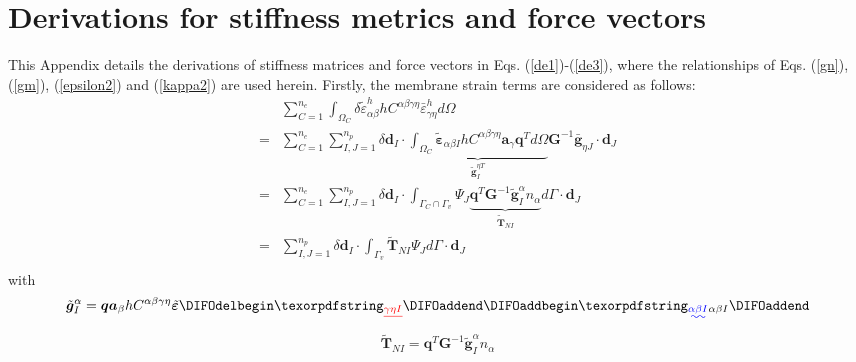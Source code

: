 \section{Derivations for stiffness metrics and force vectors}\label{derivations}
This Appendix details the derivations of stiffness matrices and force vectors in Eqs. (\ref{de1})-(\ref{de3}), where the relationships of Eqs. (\ref{gn}), (\ref{gm}), (\ref{epsilon2}) and (\ref{kappa2}) are used herein. Firstly, the membrane strain terms are considered as follows:
\begin{equation}
\begin{split}
&\sum_{C=1}^{n_e}\int_{\Omega_C} \delta \tilde \varepsilon_{\alpha\beta}^h hC^{\alpha\beta\gamma\eta}\bar \varepsilon^h_{\gamma\eta} d\Omega \\
        =&\sum_{C=1}^{n_e}\sum_{I,J=1}^{n_p}\delta \boldsymbol d_I \cdot \underbrace{\int_{\Omega_C} \tilde{\boldsymbol \varepsilon}_{\alpha\beta I} hC^{\alpha\beta\gamma\eta} \boldsymbol a_\gamma \boldsymbol q^T d\Omega}_{\tilde{\boldsymbol g}^{\eta T}_I} \boldsymbol G^{-1} \bar{\boldsymbol g}_{\eta J} \cdot \boldsymbol d_J \\
        =&\sum_{C=1}^{n_e}\sum_{I,J=1}^{n_p}\delta \boldsymbol d_I \cdot \int_{\Gamma_C\cap\Gamma_v} \Psi_J \underbrace{\boldsymbol q^T \boldsymbol G^{-1}\tilde{\boldsymbol g}^\alpha_I
        n_\alpha}_{\tilde{\boldsymbol T}_{NI}} d\Gamma
       \cdot \boldsymbol d_J \\
        =&\sum_{I,J=1}^{n_p}\delta \boldsymbol d_I \cdot \int_{\Gamma_v} \tilde{\boldsymbol T}_{NI}\Psi_J d\Gamma
       \cdot \boldsymbol d_J \\
\end{split}
\end{equation}
with
\begin{equation}
        \tilde{\boldsymbol g}^\alpha_I = \boldsymbol q \boldsymbol a_\beta hC^{\alpha\beta\gamma\eta} \tilde{\boldsymbol \varepsilon}\DIFdelbegin \DIFdel{_{\gamma\eta I}
}\DIFdelend \DIFaddbegin \DIFadd{_{\alpha\beta I}
}\DIFaddend \end{equation}
\begin{equation}
        \tilde{\boldsymbol T}_{NI} = \boldsymbol q^T \boldsymbol G^{-1} \tilde{\boldsymbol g}_I^\alpha n_\alpha
\end{equation}

